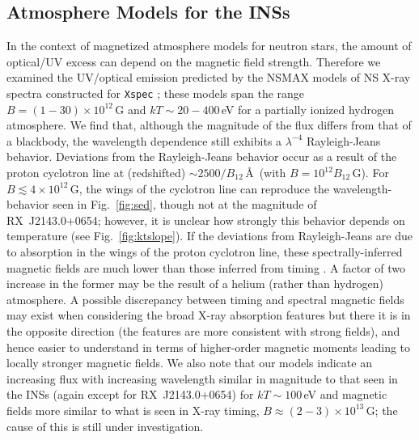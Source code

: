 \documentclass[iop]{emulateapj}
\newcommand{\rbsb}{RX~J2143.0+0654}
\begin{document}
\subsection{Atmosphere Models for the INSs}
In the context of magnetized atmosphere models for neutron stars, the
amount of optical/UV excess can depend on the magnetic field strength.
Therefore we examined the UV/optical emission predicted by the NSMAX
models of NS X-ray spectra constructed for \texttt{Xspec}
\citep{hpc08}; these models span the range $B=(1-30)\times 10^{12}$\,G
and $kT\sim 20-400$\,eV for a partially ionized hydrogen atmosphere.
We find that, although the magnitude of the flux differs from that of
a blackbody, the wavelength dependence still exhibits a $\lambda^{-4}$
Rayleigh-Jeans behavior.  Deviations from the Rayleigh-Jeans behavior
occur as a result of the proton cyclotron line at (redshifted) $\sim
2500/B_{12}$\,\AA\ (with $B=10^{12}B_{12}$\,G).  For $B\lesssim
4\times 10^{12}$\,G, the wings of the cyclotron line can reproduce the
wavelength-behavior seen in Fig.~\ref{fig:sed}, though not at the
magnitude of \rbsb; however, it is unclear how strongly this behavior
depends on temperature (see Fig.~\ref{fig:ktslope}).  If the
deviations from Rayleigh-Jeans are due to absorption in the wings of
the proton cyclotron line, these spectrally-inferred magnetic fields
are much lower than those inferred from timing \citep{kvk09b}.  A
factor of two increase in the former may be the result of a helium
(rather than hydrogen) atmosphere.  A possible discrepancy between
timing and spectral magnetic fields may exist when considering the
broad X-ray absorption features \citep{haberl07,vkk07,kvk09} but there
it is in the opposite direction (the features are more consistent with
strong fields), and hence easier to understand in terms of
higher-order magnetic moments leading to locally stronger magnetic
fields.  We also note that our models indicate an increasing flux with
increasing wavelength similar in magnitude to that seen in the INSs
(again except for \rbsb) for $kT\sim 100$\,eV and magnetic fields more
similar to what is seen in X-ray timing, $B\approx (2-3)\times
10^{13}$\,G; the cause of this is still under investigation.
\end{document}
